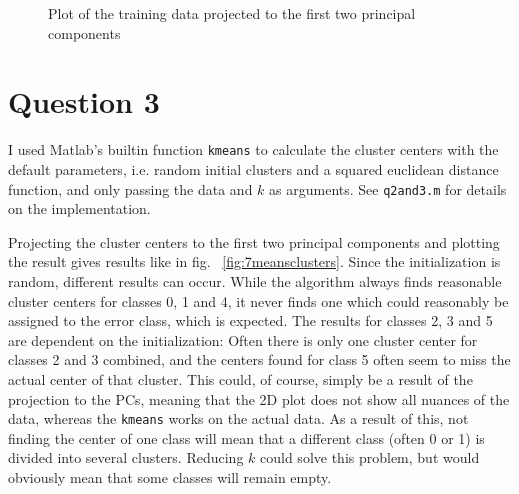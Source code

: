\documentclass{article}
\begin{document}
\begin{figure}
  \centering

  \caption{Plot of the training data projected to the first two principal components}
  \label{fig:pcaplot}
\end{figure}


\section{Question 3}

I used Matlab's builtin function \texttt{kmeans} to calculate the cluster centers with the default parameters, i.e. random initial clusters and a squared euclidean distance function, and only passing the data and $k$ as arguments. See \texttt{q2and3.m} for details on the implementation. 

Projecting the cluster centers to the first two principal components and plotting the result gives results like in fig. ~\ref{fig:7meansclusters}. Since the initialization is random, different results can occur. While the algorithm always finds reasonable cluster centers for classes 0, 1 and 4, it never finds one which could reasonably be assigned to the error class, which is expected. The results for classes 2, 3 and 5 are dependent on the initialization: Often there is only one cluster center for classes 2 and 3 combined, and the centers found for class 5 often seem to miss the actual center of that cluster. This could, of course, simply be a result of the projection to the PCs, meaning that the 2D plot does not show all nuances of the data, whereas the \texttt{kmeans} works on the actual data. As a result of this, not finding the center of one class will mean that a different class (often 0 or 1) is divided into several clusters. Reducing $k$ could solve this problem, but would obviously mean that some classes will remain empty.
\end{document}
